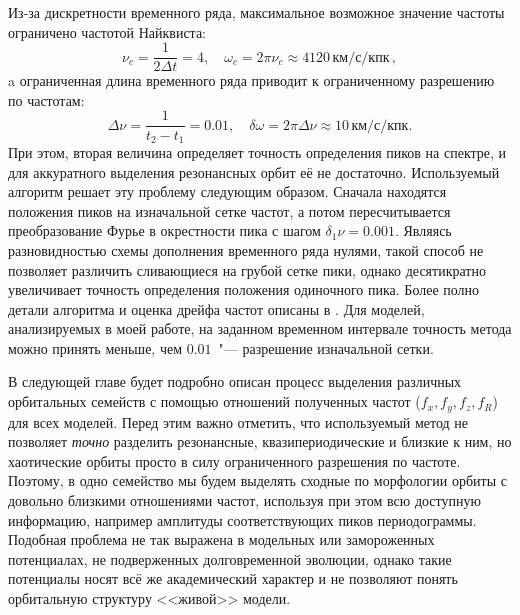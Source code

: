 \documentclass{trlnotes}
\begin{document}
Из-за дискретности временного ряда, максимальное возможное значение частоты ограничено частотой Найквиста: 
\[
  ν_c = \frac{1}{2 Δt} = 4, \quad ω_c = 2\pi ν_c \approx 4120\,\text{км}/\text{с}/\text{кпк}\,,
\]
a ограниченная длина временного ряда приводит к ограниченному разрешению по частотам: 
\[
  Δν = \frac{1}{t_2 - t_1} = 0.01, \quad δω = 2\pi Δν \approx 10\,\text{км}/\text{с}/\text{кпк}.
\]
При этом, вторая величина определяет точность определения пиков на спектре, и для аккуратного выделения резонансных
орбит её не достаточно. Используемый алгоритм решает эту проблему следующим образом. Сначала находятся положения пиков на изначальной сетке частот, а потом пересчитывается  преобразование Фурье в окрестности пика с шагом $δ_1ν = 0.001$. Являясь разновидностью схемы дополнения временного ряда нулями, такой способ не позволяет различить сливающиеся на грубой сетке пики, однако десятикратно увеличивает точность определения положения одиночного пика. Более полно детали алгоритма и оценка дрейфа частот описаны в \citet{parul2020}. Для моделей, анализируемых в моей работе, на заданном временном интервале точность метода можно принять меньше, чем $0.01$~"--- разрешение изначальной сетки.

В следующей главе будет подробно описан процесс выделения различных орбитальных семейств с помощью отношений
полученных частот ($f_x, f_y, f_z, f_R$) для всех моделей. Перед этим важно отметить, что используемый метод не
позволяет \emph{точно} разделить резонансные, квазипериодические и близкие к ним, но хаотические орбиты  просто в силу ограниченного разрешения по частоте. Поэтому, в одно семейство мы будем выделять сходные по морфологии орбиты с довольно близкими отношениями частот, используя при этом всю доступную информацию, например амплитуды соответствующих пиков
периодограммы. Подобная проблема не так выражена в модельных или замороженных потенциалах, не подверженных
долговременной эволюции, однако такие потенциалы носят всё же академический характер и не позволяют понять орбитальную структуру <<живой>> модели.  
\end{document}

